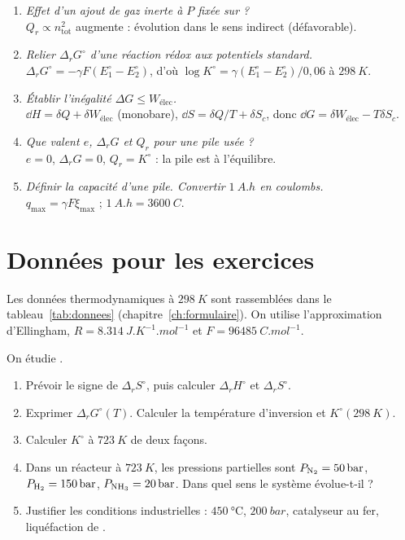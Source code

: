 \begin{enumerate}[label=\textbf{Q\arabic*.},leftmargin=2.6em,itemsep=0.5em]
  $\dd\ln K^\circ/\dd T = \Delta_rH^\circ/RT^2$ ; dériver $\ln K^\circ = -\Delta_rH^\circ/RT + \Delta_rS^\circ/R$.
  \item \emph{Effet d'un ajout de gaz inerte à $P$ fixée sur  ?}\\
  $Q_r\propto n_{\text{tot}}^{2}$ augmente : évolution dans le sens indirect (défavorable).
  \item \emph{Relier $\Delta_rG^\circ$ d'une réaction rédox aux potentiels standard.}\\
  $\Delta_rG^\circ = -\gamma F(E_1^\circ - E_2^\circ)$, d'où $\log K^\circ = \gamma(E_1^\circ - E_2^\circ)/0{,}06$ à $\SI{298}{K}$.
  \item \emph{Établir l'inégalité $\Delta G\leq W_{\text{élec}}$.}\\
  $\dd H = \delta Q + \delta W_{\text{élec}}$ (monobare), $\dd S = \delta Q/T + \delta S_c$, donc $\dd G = \delta W_{\text{élec}} - T\delta S_c$.
  \item \emph{Que valent $e$, $\Delta_rG$ et $Q_r$ pour une pile usée ?}\\
  $e = 0$, $\Delta_rG = 0$, $Q_r = K^\circ$ : la pile est à l'équilibre.
  \item \emph{Définir la capacité d'une pile. Convertir $\SI{1}{A.h}$ en coulombs.}\\
  $q_{\max} = \gamma F\xi_{\max}$ ; $\SI{1}{A.h} = \SI{3600}{C}$.
\end{enumerate}

\section*{Données pour les exercices}
Les données thermodynamiques à $\SI{298}{K}$ sont rassemblées dans le tableau~\ref{tab:donnees} (chapitre~\ref{ch:formulaire}). On utilise l'approximation d'Ellingham, $R = \SI{8,314}{J.K^{-1}.mol^{-1}}$ et $F = \SI{96485}{C.mol^{-1}}$.

\label{exo:nh3}
On étudie .
\begin{enumerate}
  \item Prévoir le signe de $\Delta_rS^\circ$, puis calculer $\Delta_rH^\circ$ et $\Delta_rS^\circ$.
  \item Exprimer $\Delta_rG^\circ(T)$. Calculer la température d'inversion et $K^\circ(\SI{298}{K})$.
  \item Calculer $K^\circ$ à $\SI{723}{K}$ de deux façons.
  \item Dans un réacteur à $\SI{723}{K}$, les pressions partielles sont $P_{\ce{N2}} = \SI{50}{bar}$, $P_{\ce{H2}} = \SI{150}{bar}$, $P_{\ce{NH3}} = \SI{20}{bar}$. Dans quel sens le système évolue-t-il ?
  \item Justifier les conditions industrielles : $\SI{450}{\celsius}$, $\SI{200}{bar}$, catalyseur au fer, liquéfaction de .
\end{enumerate}

